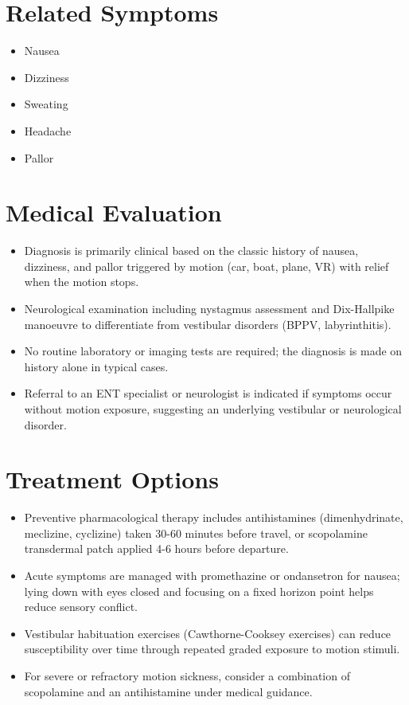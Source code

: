 \section*{Related Symptoms}
\begin{itemize}
  \item Nausea
  \item Dizziness
  \item Sweating
  \item Headache
  \item Pallor
\end{itemize}

\section*{Medical Evaluation}
\begin{itemize}
  \item Diagnosis is primarily clinical based on the classic history of nausea, dizziness, and pallor triggered by motion (car, boat, plane, VR) with relief when the motion stops.
  \item Neurological examination including nystagmus assessment and Dix-Hallpike manoeuvre to differentiate from vestibular disorders (BPPV, labyrinthitis).
  \item No routine laboratory or imaging tests are required; the diagnosis is made on history alone in typical cases.
  \item Referral to an ENT specialist or neurologist is indicated if symptoms occur without motion exposure, suggesting an underlying vestibular or neurological disorder.
\end{itemize}

\section*{Treatment Options}
\begin{itemize}
  \item Preventive pharmacological therapy includes antihistamines (dimenhydrinate, meclizine, cyclizine) taken 30-60 minutes before travel, or scopolamine transdermal patch applied 4-6 hours before departure.
  \item Acute symptoms are managed with promethazine or ondansetron for nausea; lying down with eyes closed and focusing on a fixed horizon point helps reduce sensory conflict.
  \item Vestibular habituation exercises (Cawthorne-Cooksey exercises) can reduce susceptibility over time through repeated graded exposure to motion stimuli.
  \item For severe or refractory motion sickness, consider a combination of scopolamine and an antihistamine under medical guidance.
\end{itemize}

